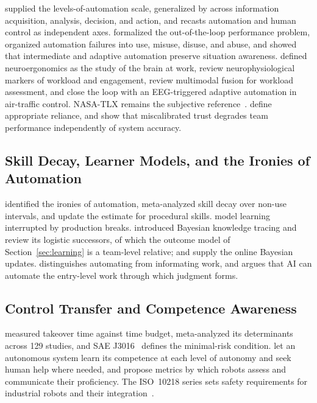 \documentclass[utf8]{frontiers_suppmat}
\begin{document}
\citet{SheridanVerplank1978} supplied the levels-of-automation scale, generalized by \citet{Parasuraman2000} across information acquisition, analysis, decision, and action, and \citet{Shneiderman2020} recasts automation and human control as independent axes. \citet{EndsleyKiris1995} formalized the out-of-the-loop performance problem, \citet{ParasuramanRiley1997} organized automation failures into use, misuse, disuse, and abuse, and \citet{KaberEndsley2004} showed that intermediate and adaptive automation preserve situation awareness. \citet{Parasuraman2003} defined neuroergonomics as the study of the brain at work, \citet{Dehais2020} review neurophysiological markers of workload and engagement, \citet{Debie2021} review multimodal fusion for workload assessment, and \citet{Arico2016} close the loop with an EEG-triggered adaptive automation in air-traffic control. NASA-TLX remains the subjective reference~\citep{HartStaveland1988}. \citet{LeeSee2004} define appropriate reliance, and \citet{Wischnewski2023} show that miscalibrated trust degrades team performance independently of system accuracy.

\subsection{Skill Decay, Learner Models, and the Ironies of Automation}
\label{app:rw-skill}

\citet{Bainbridge1983} identified the ironies of automation, \citet{Arthur1998} meta-analyzed skill decay over non-use intervals, and \citet{TatelAckerman2025} update the estimate for procedural skills. \citet{JaberBonney1996} model learning interrupted by production breaks. \citet{Corbett1994} introduced Bayesian knowledge tracing and \citet{Pelanek2017} review its logistic successors, of which the outcome model of Section~\ref{sec:learning} is a team-level relative; \citet{Glickman1999} and \citet{Minka2001} supply the online Bayesian updates. \citet{Zuboff1988} distinguishes automating from informating work, and \citet{Rashidi2026} argues that AI can automate the entry-level work through which judgment forms.

\subsection{Control Transfer and Competence Awareness}
\label{app:rw-takeover}

\citet{Gold2013} measured takeover time against time budget, \citet{Zhang2019} meta-analyzed its determinants across 129 studies, and SAE J3016~\citep{SAEJ3016} defines the minimal-risk condition. \citet{Basich2020} let an autonomous system learn its competence at each level of autonomy and seek human help where needed, and \citet{Norton2022} propose metrics by which robots assess and communicate their proficiency. The ISO~10218 series sets safety requirements for industrial robots and their integration~\citep{ISO2025,ISO2025b}.
\end{document}

